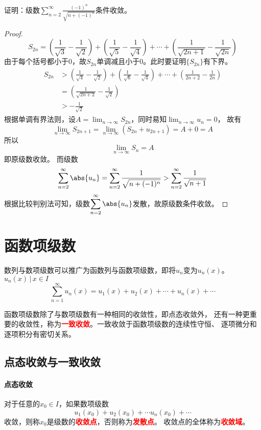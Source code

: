 \begin{example}
    证明：级数$\displaystyle\sum_{n=2}^\infty \frac{(-1)^n}{\sqrt{n + (-1)^n}}$条件收敛。
\end{example}
\begin{proof}
    \[
        S_{2n}
        = \left(\frac{1}{\sqrt{3}} - \frac{1}{\sqrt{2}}\right)
        + \left(\frac{1}{\sqrt{5}}-\frac{1}{\sqrt{4}}\right)
        + \cdots
        + \left(\frac{1}{\sqrt{2n+1}} - \frac{1}{\sqrt{2n}}\right)
    \]
    由于每个括号都小于$0$，故$S_{2n}$单调减且小于$0$。此时要证明$\{S_{2n}\}$有下界。
    \begin{align*}
        S_{2n}
         & > \left(\frac{1}{\sqrt{4}} - \frac{1}{\sqrt{2}}\right)
        + \left(\frac{1}{\sqrt{6}}-\frac{1}{\sqrt{4}}\right)
        + \cdots
        + \left(\frac{1}{2n+2} - \frac{1}{2n}\right)              \\
         & =
        \left(\frac{1}{\sqrt{2n+2}} - \frac{1}{\sqrt{2}}\right)   \\
         & > -\frac{1}{\sqrt{2}}
    \end{align*}
    根据单调有界法则，设$\displaystyle A = \lim_{n\to\infty} S_{2n}$，同时易知$\displaystyle \lim_{n\to\infty} u_n = 0$，
    故有
    \[ \lim_{n\to\infty} S_{2n+1} = \lim_{n\to\infty} (S_{2n} +u_{2n+1}) = A + 0 = A \]
    所以
    \[ \lim_{n\to\infty} S_n = A \]
    即原级数收敛。
    而级数
    \[
        \sum_{n=2}^\infty \abs{u_n}
        =
        \sum_{n=2}^\infty \frac{1}{\sqrt{n+(-1)^n}}
        >
        \sum_{n=2}^\infty \frac{1}{\sqrt{n+1}}
    \]
    根据比较判别法可知，级数$\displaystyle\sum_{n=2}^\infty \abs{u_n}$发散，故原级数条件收敛。
\end{proof}

\section{函数项级数}
数列与数项级数可以推广为函数列与函数项级数，即将$u_n$变为$u_n(x)$。${u_n(x)\,|\,x\in I}$
\[ \sum_{n=1}^\infty u_n(x) = u_1(x) + u_2(x) + \cdots + u_n(x) + \cdots \]

函数项级数除了与数项级数有一种相同的收敛性，即点态收敛外，
还有一种更重要的收敛性，称为\textcolor{red}{\textbf{\textsf{一致收敛}}}。一致收敛于函数项级数的连续性守恒、
逐项微分和逐项积分有密切关系。

\subsection{点态收敛与一致收敛}
\paragraph{点态收敛}
对于任意的$x_0\in I$，如果数项级数
\[ u_1(x_0) + u_2(x_0) + \cdots u_n(x_0) + \cdots \]
收敛，则称$x_0$是级数的\textcolor{red}{\textbf{\textsf{收敛点}}}，否则称为\textcolor{red}{\textbf{\textsf{发散点}}}。
收敛点的全体称为\textcolor{red}{\textbf{\textsf{收敛域}}}。

